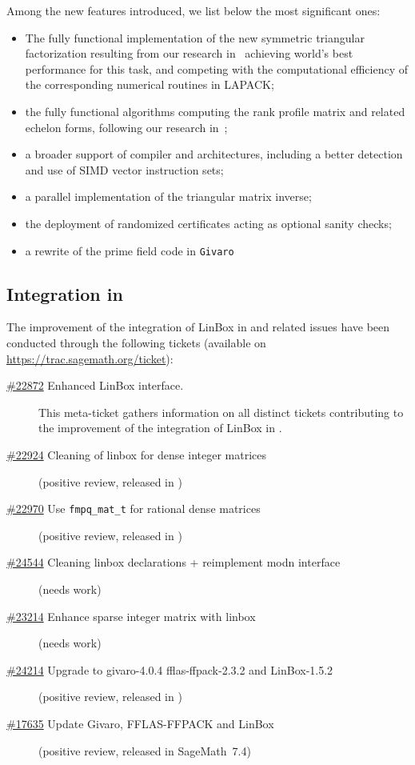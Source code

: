 \documentclass{deliverablereport}
\begin{document}
Among the new features introduced, we list below the most significant ones:
\begin{itemize}
\item The fully functional implementation of the new symmetric triangular
  factorization resulting from our research in~\cite{DuPe18} achieving world's
  best performance for this task, and competing with the computational
  efficiency of the corresponding numerical routines in LAPACK;
\item the fully functional algorithms computing the rank profile matrix and
  related echelon forms, following our research in~\cite{DPS17};
\item a broader support of compiler and architectures, including a better
  detection and use of SIMD vector instruction sets;
\item a parallel implementation of the triangular matrix inverse;
\item the deployment of randomized certificates acting as optional sanity checks;
\item a rewrite of the prime field code in \texttt{Givaro}
\end{itemize}
\subsection{Integration in \Sage}


The improvement of the integration of LinBox in \Sage and related issues have
been conducted through the following tickets (available on \url{https://trac.sagemath.org/ticket}):
{\small
  \begin{description}
\item[\href{https://trac.sagemath.org/ticket/22872}{\#22872}
  Enhanced LinBox interface.]
  This meta-ticket gathers information on all distinct tickets contributing to
  the improvement of the integration of LinBox in \Sage. 
\item[\href{https://trac.sagemath.org/ticket/22924}{\#22924}
  Cleaning of linbox for dense integer matrices] (positive review, released in )
\item[\href{https://trac.sagemath.org/ticket/22970}{\#22970}
  Use \texttt{fmpq\_mat\_t} for rational dense matrices]
  (positive review, released in )
\item[\href{https://trac.sagemath.org/ticket/24544}{\#24544}
  Cleaning linbox declarations + reimplement modn interface]
  (needs work)
\item[\href{https://trac.sagemath.org/ticket/23214}{\#23214}
  Enhance sparse integer matrix with linbox]
  (needs work)
\item[\href{https://trac.sagemath.org/ticket/24214}{\#24214}
  Upgrade to givaro-4.0.4 fflas-ffpack-2.3.2 and LinBox-1.5.2]
  (positive review, released in )
\item[\href{https://trac.sagemath.org/ticket/17635}{\#17635}
  	Update Givaro, FFLAS-FFPACK and LinBox]
  (positive review, released in Sage\-Math~7.4)
\end{description}
}
\end{document}
